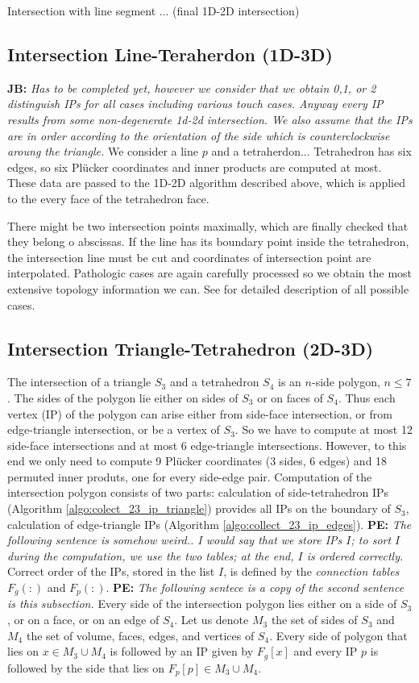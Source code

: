 \documentclass{elsarticle}
\newcommand{\noteJB}[1]{{\color{Blue} \textbf{JB: } \textit{#1}}}
\newcommand{\notePE}[1]{{\color{Orange} \textbf{PE: } \textit{#1}}}
\newcommand{\plucker}{Pl\"{u}cker }
\begin{document}
Intersection with line segment ... (final 1D-2D intersection)

\subsection{Intersection Line-Teraherdon (1D-3D)}
\noteJB{Has to be completed yet, however we consider that we obtain 0,1, or 2 distinguish IPs for all cases including various touch cases. Anyway every IP results from 
some non-degenerate 1d-2d intersection. We also assume that the IPs are in order according to the orientation of the side which is
counterclockwise aroung the triangle.}
We consider a line $p$ and a tetraherdon...
Tetrahedron has six edges, so six \plucker coordinates and inner products are computed at most. These data are
passed to the 1D-2D algorithm described above, which is applied to the every face of the tetrahedron face. 

There might be two intersection points maximally, which are finally checked that they belong o abscissas.
If the line has its boundary point inside the tetrahedron, the intersection line must be cut
and coordinates of intersection point are interpolated.
Pathologic cases are again carefully processed so we obtain the most extensive topology information we can.
See \cite{fris_dp_2015} for detailed description of all possible cases.

\subsection{Intersection Triangle-Tetrahedron (2D-3D)}
The intersection of a triangle $S_3$ and a tetrahedron $S_4$ is an $n$-side polygon, $n\le 7$. The sides of the polygon
lie either on sides of $S_3$ or on faces of $S_4$. Thus each vertex (IP) of the polygon
can arise either from side-face intersection, or from edge-triangle intersection, or be a vertex of $S_3$.
So we have to compute at most 12 side-face intersections and at most 6 edge-triangle intersections. However,
to this end we only need to compute 9 \plucker coordinates (3 sides, 6 edges) and 18 permuted inner produts, one for every side-edge pair.
Computation of the intersection polygon consists of two parts: calculation of side-tetrahedron IPs (Algorithm \ref{algo:colect_23_ip_triangle})
provides all IPs on the boundary of $S_3$,
calculation of edge-triangle IPs (Algorithm \ref{algo:collect_23_ip_edges}).
\notePE{The following sentence is somehow weird.. I would say that we store IPs $I$; to sort $I$ during the computation, we use the two tables; at the end, $I$ is ordered correctly.}
Correct order of the IPs, stored in the list $I$, is defined by the \emph{connection tables} $F_g(:)$ and $F_p(:)$. \notePE{The following sentece is a copy of the second sentence is this subsection.} Every side of the intersection polygon 
lies either on a side of $S_3$, or on a face, or on an edge of $S_4$. Let us denote $M_3$ the set of sides of $S_3$ and $M_4$ the set of volume,
faces, edges, and vertices of $S_4$. Every side of polygon that lies on $x\in M_3\cup M_4$ is followed by an IP given by $F_g[x]$ 
and every IP $p$ is followed by the side that lies on $F_p[p]\in M_3\cup M_4$. 
\end{document}
